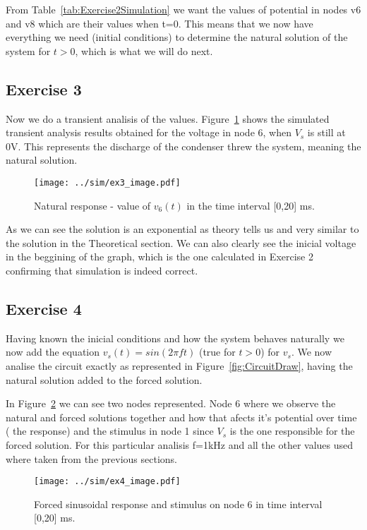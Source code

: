 From Table~\ref{tab:Exercise2Simulation} we want the values of potential in nodes v6 and v8 which are their values when t=0. This means that we now have everything we need (initial conditions) to determine the natural solution of the system for $t>0$, which is what we will do next.

\subsection{Exercise 3}

Now we do a transient analisis of the values. Figure~\ref{fig:Ex3_Image} shows the simulated transient analysis results obtained for the voltage in node 6, when $V_s$ is still at 0V. This represents the discharge of the condenser threw the system, meaning the natural solution.
\vspace{-30mm}
\begin{figure}[H]
  \centering
  \small
  \texttt{[image: ../sim/ex3\_image.pdf]}
  \caption{Natural response - value of $v_6(t)$ in the time interval [0,20] ms.}
  \label{fig:Ex3_Image}
\end{figure}

As we can see the solution is an exponential as theory tells us and very similar to the solution in the Theoretical section. We can also clearly see the inicial voltage in the beggining of the graph, which is the one calculated in Exercise 2 confirming that simulation is indeed correct. 
\vspace{-30mm}
\subsection{Exercise 4}
Having known the inicial conditions and how the system behaves naturally we now add the equation $v_s(t)=sin(2 \pi f t)$ (true for $t>0$) for $v_s$. We now analise the circuit exactly as represented in Figure~\ref{fig:CircuitDraw}, having the natural solution added to the forced solution.\par
In Figure~\ref{fig:Ex4_Image} we can see two nodes represented. Node 6 where we observe the natural and forced solutions together and how that afects it's potential over time ( the response) and the stimulus in node 1 since $V_s$ is the one responsible for the forced solution. For this particular analisis f=1kHz and all the other values used where taken from the previous sections. 
\vspace{-30mm}
\begin{figure}[H]
  \centering
  \texttt{[image: ../sim/ex4\_image.pdf]}
  \caption{Forced sinusoidal response and stimulus on node 6 in time interval [0,20] ms.}
  \label{fig:Ex4_Image}
\end{figure}

